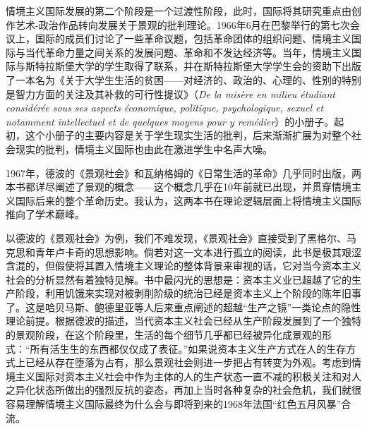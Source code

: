 \documentclass[fontset=fandol, a4paper, 12pt, openright]{ctexbook}
\begin{document}
情境主义国际发展的第二个阶段是一个过渡性阶段，此时，国际将其研究重点由创作艺术-政治作品转向发展关于景观的批判理论。1966年6月在巴黎举行的第七次会议上，国际的成员们讨论了一些革命议题，包括革命团体的组织问题、情境主义国际与当代革命力量之间关系的发展问题、革命和不发达经济等。当年，情境主义国际与斯特拉斯堡大学的学生取得了联系，并在斯特拉斯堡大学学生会的资助下出版了一本名为《关于大学生生活的贫困——对经济的、政治的、心理的、性别的特别是智力方面的关注及其补救的可行性提议》（\textit{De la misère en milieu étudiant considérée sous ses aspects économique, politique, psychologique, sexuel et notamment intellectuel et de quelques moyens pour y remédier}）的小册子。起初，这个小册子的主要内容是关于学生现实生活的批判，后来渐渐扩展为对整个社会现实的批判，情境主义国际也由此在激进学生中名声大噪。

1967年，德波的《景观社会》和瓦纳格姆的《日常生活的革命》几乎同时出版，两本书都详尽阐述了景观的概念——这个概念几乎在10年前就已出现，并贯穿情境主义国际后来的整个革命历史。我认为，这两本书在理论逻辑层面上将情境主义国际推向了学术巅峰。

以德波的《景观社会》为例，我们不难发现，《景观社会》直接受到了黑格尔、马克思和青年卢卡奇的思想影响。倘若对这一文本进行孤立的阅读，此书是极其艰涩含混的，但假使将其置入情境主义理论的整体背景来审视的话，它对当今资本主义社会的分析显然有着独特见解。书中最闪光的思想是：资本主义业已超越了它的生产阶段，利用饥饿来实现对被剥削阶级的统治已经是资本主义上个阶段的陈年旧事了。这是哈贝马斯、鲍德里亚等人后来重点阐述的超越“生产之镜”一类论点的隐性理论前提。根据德波的描述，当代资本主义社会已经从生产阶段发展到了一个独特的景观阶段，在这个阶段里，生活的每个细节几乎都已经被异化成景观的形式：“所有活生生的东西都仅仅成了表征。”如果说资本主义生产方式在人的生存方式上已经从存在堕落为占有，那么景观社会则进一步把占有转变为外观。考虑到情境主义国际对资本主义社会中作为主体的人的生产状态一直不减的积极关注和对人之异化状态所做出的强烈反抗的姿态，再加上当时各种复杂的社会危机，我们就很容易理解情境主义国际最终为什么会与即将到来的1968年法国“红色五月风暴”合流。
\end{document}

